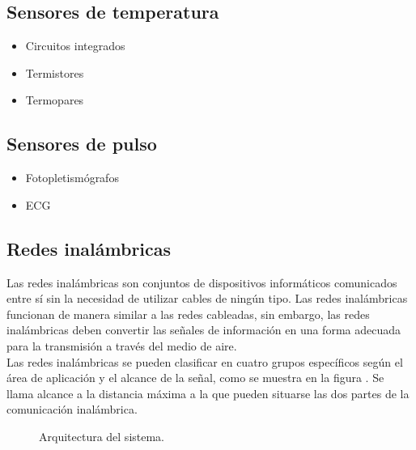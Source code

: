 	\subsection{Sensores de temperatura}
		\begin{itemize}
			\item Circuitos integrados
			\item Termistores
			\item Termopares
		\end{itemize}
	\subsection{Sensores de pulso}
		\begin{itemize}
			\item Fotopletismógrafos
			\item ECG
		\end{itemize}
	
	\subsection{Redes inalámbricas}	
	Las redes inalámbricas son conjuntos de dispositivos informáticos comunicados entre sí  sin la necesidad de utilizar cables de ningún tipo. Las redes inalámbricas funcionan de manera similar a las redes cableadas, sin embargo, las redes inalámbricas deben convertir las señales de información en una forma adecuada para la transmisión a través del medio de aire. \\
	
	Las redes inalámbricas se pueden clasificar en cuatro grupos específicos según el área de aplicación y el alcance de la señal, como se muestra en la figura . Se llama alcance a la distancia máxima a la que pueden situarse las dos partes de la comunicación inalámbrica.
	
	\begin{figure}[htbp!]
		\centering
		\caption{Arquitectura del sistema.}
		\label{fig:tiposRedes}
	\end{figure}
	

